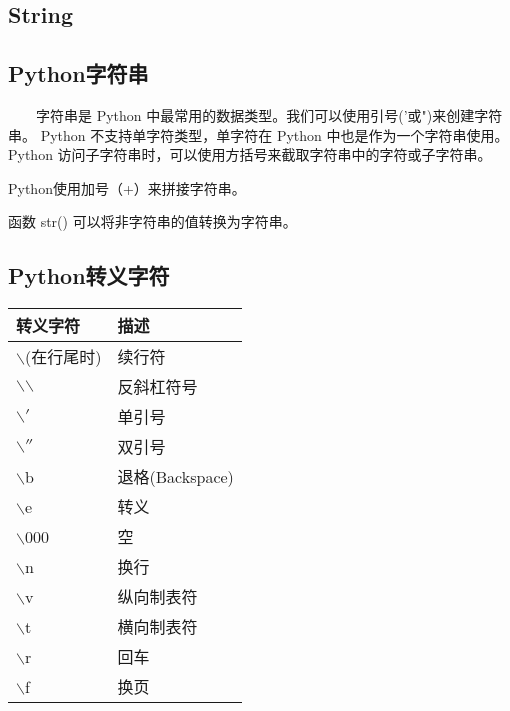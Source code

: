 \documentclass{book}
\begin{document}
\begin{CJK}{UTF8}{gbsn}
\section{String}


\subsection{Python字符串}
\ \ \ \ 字符串是 Python 中最常用的数据类型。我们可以使用引号('或")来创建字符串。
Python 不支持单字符类型，单字符在 Python 中也是作为一个字符串使用。Python 访问子字符串时，可以使用方括号来截取字符串中的字符或子字符串。

Python使用加号（+）来拼接字符串。

函数 str() 可以将非字符串的值转换为字符串。

\subsection{Python转义字符}
\begin{center}
\begin{tabular}{|l|l|}
	\hline 转义字符   					& 描述\\ 	
	\hline $\backslash$(在行尾时) 		& 续行符\\
	\hline $\backslash$$\backslash$		& 反斜杠符号\\
	\hline $\backslash$$'$		        & 单引号\\
	\hline $\backslash$$''$				& 双引号\\
	\hline $\backslash$b					& 退格(Backspace)\\
	\hline $\backslash$e					& 转义\\
	\hline $\backslash$000				& 空\\	
	\hline $\backslash$n					& 换行\\
	\hline $\backslash$v					& 纵向制表符\\
	\hline $\backslash$t					& 横向制表符\\
	\hline $\backslash$r     			& 回车     \\
	\hline $\backslash$f      			& 换页    \\
	\hline
\end{tabular}
\end{center}


\end{CJK}
\end{document}
